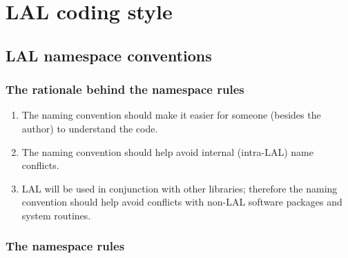 \documentclass[]{ligodcc}
\begin{document}
\section{LAL coding style}
\label{sec:codingstyle}

\subsection{LAL namespace conventions}

\subsubsection{The rationale behind the namespace rules}

\begin{enumerate}
\item
The naming convention should make  it easier for someone
(besides the author) to understand the code.

\item
The naming convention should help avoid  internal (intra-LAL)
name conflicts.

\item
LAL will be used in conjunction with other libraries;
therefore the naming convention should help avoid conflicts with
non-LAL software packages and system routines.

\end{enumerate}

\subsubsection{The namespace rules}
\end{document}
